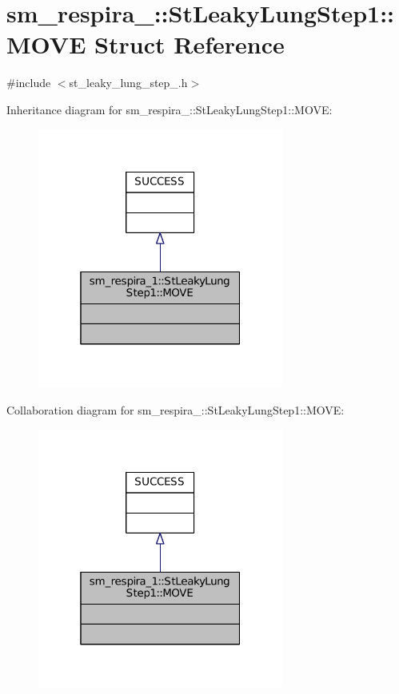 \hypertarget{structsm__respira__1_1_1StLeakyLungStep1_1_1MOVE}{}\section{sm\+\_\+respira\+\_\+:\+:St\+Leaky\+Lung\+Step1\+:\+:M\+O\+VE Struct Reference}
\label{structsm__respira__1_1_1StLeakyLungStep1_1_1MOVE}


{\ttfamily \#include $<$st\+\_\+leaky\+\_\+lung\+\_\+step\+\_.\+h$>$}



Inheritance diagram for sm\+\_\+respira\+\_\+:\+:St\+Leaky\+Lung\+Step1\+:\+:M\+O\+VE\+:
\nopagebreak
\begin{figure}[H]
\begin{center}
\leavevmode
\includegraphics[width=229pt]{structsm__respira__1_1_1StLeakyLungStep1_1_1MOVE__inherit__graph}
\end{center}
\end{figure}


Collaboration diagram for sm\+\_\+respira\+\_\+:\+:St\+Leaky\+Lung\+Step1\+:\+:M\+O\+VE\+:
\nopagebreak
\begin{figure}[H]
\begin{center}
\leavevmode
\includegraphics[width=229pt]{structsm__respira__1_1_1StLeakyLungStep1_1_1MOVE__coll__graph}
\end{center}
\end{figure}


